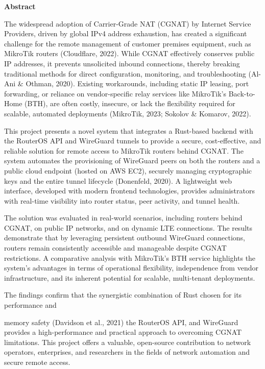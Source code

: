 \documentclass[12pt,a4paper,oneside]{report}
\begin{document}
 




\tableofcontents
\clearpage

\textbf{Abstract}


The widespread adoption of Carrier-Grade NAT (CGNAT) by Internet Service Providers, driven by global IPv4 address exhaustion, has created a significant challenge for the remote management of customer premises equipment, such as MikroTik routers (Cloudflare, 2022). While CGNAT effectively conserves public IP addresses, it prevents unsolicited inbound connections, thereby breaking traditional methods for direct configuration, monitoring, and troubleshooting (Al-Ani \& Othman, 2020). Existing workarounds, including static IP leasing, port forwarding, or reliance on vendor-specific relay services like MikroTik's Back-to-Home (BTH), are often costly, insecure, or lack the flexibility required for scalable, automated deployments (MikroTik, 2023; Sokolov \& Komarov, 2022).




This project presents a novel system that integrates a Rust-based backend with the RouterOS API and WireGuard tunnels to provide a secure, cost-effective, and reliable solution for remote access to MikroTik routers behind CGNAT. The system automates the provisioning of WireGuard peers on both the routers and a public cloud endpoint (hosted on AWS EC2), securely managing cryptographic keys and the entire tunnel lifecycle (Donenfeld, 2020). A lightweight web interface, developed with modern frontend technologies, provides administrators with real-time visibility into router status, peer activity, and tunnel health.




The solution was evaluated in real-world scenarios, including routers behind CGNAT, on public IP networks, and on dynamic LTE connections. The results demonstrate that by leveraging persistent outbound WireGuard connections, routers remain consistently accessible and manageable despite CGNAT restrictions. A comparative analysis with MikroTik's BTH service highlights the system's advantages in terms of operational flexibility, independence from vendor infrastructure, and its inherent potential for scalable, multi-tenant deployments.


The findings confirm that the synergistic combination of Rust chosen for its performance and


memory safety (Davidson et al., 2021) the RouterOS API, and WireGuard provides a high-performance and practical approach to overcoming CGNAT limitations. This project offers a valuable, open-source contribution to network operators, enterprises, and researchers in the fields of network automation and secure remote access.
\end{document}
